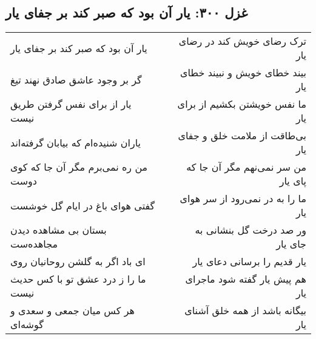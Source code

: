 \begin{center}
\section*{غزل ۳۰۰: یار آن بود که صبر کند بر جفای یار}
\label{sec:300}
\begin{longtable}{l p{0.5cm} r}
یار آن بود که صبر کند بر جفای یار
&&
ترک رضای خویش کند در رضای یار
\\
گر بر وجود عاشق صادق نهند تیغ
&&
بیند خطای خویش و نبیند خطای یار
\\
یار از برای نفس گرفتن طریق نیست
&&
ما نفس خویشتن بکشیم از برای یار
\\
یاران شنیده‌ام که بیابان گرفته‌اند
&&
بی‌طاقت از ملامت خلق و جفای یار
\\
من ره نمی‌برم مگر آن جا که کوی دوست
&&
من سر نمی‌نهم مگر آن جا که پای یار
\\
گفتی هوای باغ در ایام گل خوشست
&&
ما را به در نمی‌رود از سر هوای یار
\\
بستان بی مشاهده دیدن مجاهده‌ست
&&
ور صد درخت گل بنشانی به جای یار
\\
ای باد اگر به گلشن روحانیان روی
&&
یار قدیم را برسانی دعای یار
\\
ما را ز درد عشق تو با کس حدیث نیست
&&
هم پیش یار گفته شود ماجرای یار
\\
هر کس میان جمعی و سعدی و گوشه‌ای
&&
بیگانه باشد از همه خلق آشنای یار
\\
\end{longtable}
\end{center}
